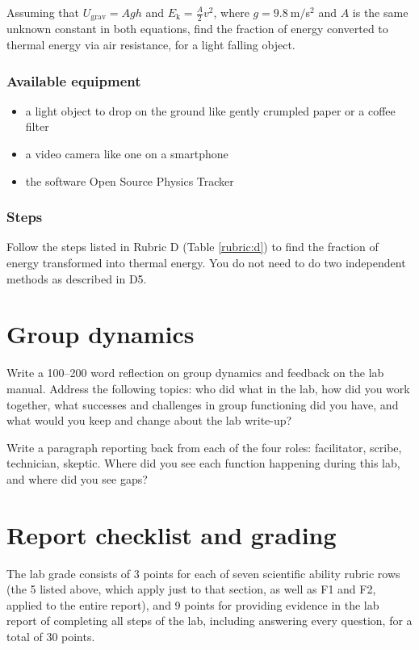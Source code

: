 Assuming that $U_\mathrm{grav} = Agh$ and $E_\mathrm{k} = \frac{A}{2} v^2$, where $g = 9.8\:$m$/$s$^2$ and $A$ is the same unknown constant in both equations, find the fraction of energy converted to thermal energy via air resistance, for a light falling object.

\subsubsection{Available equipment}

\begin{itemize}
	\item a light object to drop on the ground like gently crumpled paper or a coffee filter
	\item a video camera like one on a smartphone
	\item the software Open Source Physics Tracker
\end{itemize}

\subsubsection{Steps}

\begin{steps}
	\item Follow the steps listed in Rubric D (Table \ref{rubric:d}) to find the fraction of energy transformed into thermal energy. You do not need to do two independent methods as described in D5.
\end{steps}

\section{Group dynamics}

\begin{steps}
	\item Write a 100--200 word reflection on group dynamics and feedback on the lab manual. Address the following topics: who did what in the lab, how did you work together, what successes and challenges in group functioning did you have, and what would you keep and change about the lab write-up?
	
	\item Write a paragraph reporting back from each of the four roles: facilitator, scribe, technician, skeptic. Where did you see each function happening during this lab, and where did you see gaps?
\end{steps}

\section{Report checklist and grading}

The lab grade consists of 3 points for each of seven scientific ability rubric rows (the 5 listed above, which apply just to that section, as well as F1 and F2, applied to the entire report), and 9 points for providing evidence in the lab report of completing all steps of the lab, including answering every question, for a total of 30 points.